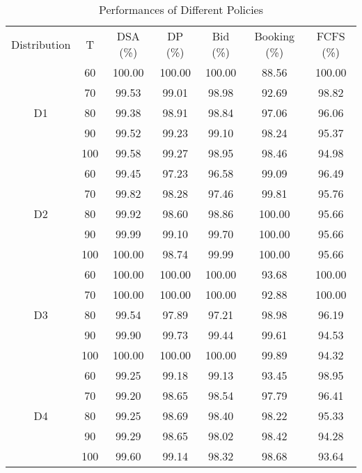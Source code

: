 \begin{table}[h]
    \centering
    \caption{Performances of Different Policies}
    \begin{tabular}{ccccccc}
    \hline
    Distribution & T & DSA (\%) & DP (\%) & Bid (\%) & Booking (\%) & FCFS (\%) \\
    \cmidrule(r){0-1} \cmidrule(lr){3-3} \cmidrule(lr){4-4} \cmidrule(lr){5-5} \cmidrule(lr){6-6} \cmidrule(l){7-7}
    \multirow{5}{*}{D1} & 60 & 100.00 & 100.00 & 100.00 & 88.56 & 100.00 \\
    & 70    & 99.53 & 99.01 & 98.98 & 92.69 & 98.82 \\
    & 80    & 99.38 & 98.91 & 98.84 & 97.06 & 96.06 \\
    & 90    & 99.52 & 99.23 & 99.10 & 98.24 & 95.37 \\
    & 100   & 99.58 & 99.27 & 98.95 & 98.46 & 94.98 \\
    \hline
    \multirow{5}{*}{D2} & 60  & 99.45 & 97.23 & 96.58 & 99.09 & 96.49 \\
       & 70   & 99.82 & 98.28 & 97.46 & 99.81 & 95.76 \\
       & 80   & 99.92 & 98.60 & 98.86 & 100.00 & 95.66 \\
       & 90   & 99.99 & 99.10 & 99.70 & 100.00 & 95.66 \\
       & 100  & 100.00 & 98.74 & 99.99 & 100.00 & 95.66 \\
    \hline
    \multirow{5}{*}{D3} & 60  & 100.00 & 100.00 & 100.00 & 93.68 & 100.00 \\
       & 70  & 100.00 & 100.00 & 100.00 & 92.88 & 100.00 \\
       & 80  & 99.54 & 97.89 & 97.21 & 98.98 & 96.19 \\
       & 90  & 99.90 & 99.73 & 99.44 & 99.61 & 94.53 \\
       & 100 & 100.00 & 100.00 & 100.00 & 99.89 & 94.32 \\
    \hline
      \multirow{5}{*}{D4} & 60  & 99.25 & 99.18 & 99.13 & 93.45 & 98.95 \\
       & 70  & 99.20 & 98.65 & 98.54 & 97.79 & 96.41 \\
       & 80  & 99.25 & 98.69 & 98.40 & 98.22 & 95.33 \\
       & 90  & 99.29 & 98.65 & 98.02 & 98.42 & 94.28 \\
       & 100 & 99.60 & 99.14 & 98.32 & 98.68 & 93.64 \\
    \hline
    \end{tabular}
  \end{table}


